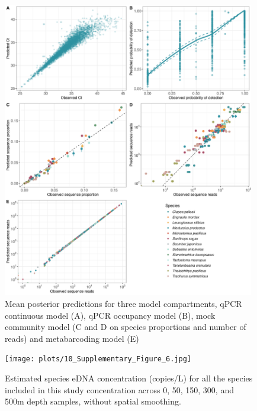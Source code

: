 \documentclass{article}
\begin{document}
\begin{figure}
\centering
\includegraphics[width=0.98\textwidth]{plots/9_Supplementary_Figure_5.jpg}
\caption{Mean posterior predictions for three model compartments, qPCR continuous model (A), qPCR occupancy model (B), mock community model (C and D on species proportions and number of reads) and metabarcoding model (E)}
\end{figure}

\begin{figure}
\centering
\texttt{[image: plots/10\_Supplementary\_Figure\_6.jpg]}
\caption{Estimated species eDNA concentration (copies/L) for all the species included in this study concentration across 0, 50, 150, 300, and 500m depth samples, without spatial smoothing.}
\end{figure}
\end{document}
